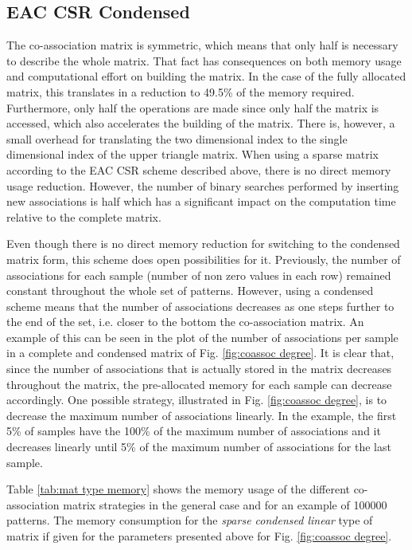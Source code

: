 \subsection{EAC CSR Condensed}

The co-association matrix is symmetric, which means that only half is necessary to describe the whole matrix.
That fact has consequences on both memory usage and computational effort on building the matrix.
In the case of the fully allocated matrix, this translates in a reduction to 49.5\% of the memory required.
Furthermore, only half the operations are made since only half the matrix is accessed, which also accelerates the building of the matrix.
There is, however, a small overhead for translating the two dimensional index to the single dimensional index of the upper triangle matrix.
When using a sparse matrix according to the EAC CSR scheme described above, there is no direct memory usage reduction.
However, the number of binary searches performed by inserting new associations is half which has a significant impact on the computation time relative to the complete matrix.

Even though there is no direct memory reduction for switching to the condensed matrix form, this scheme does open possibilities for it.
Previously, the number of associations for each sample (number of non zero values in each row) remained constant throughout the whole set of patterns.
However, using a condensed scheme means that the number of associations decreases as one steps further to the end of the set, i.e. closer to the bottom the co-association matrix.
An example of this can be seen in the plot of the number of associations per sample in a complete and condensed matrix of Fig. \ref{fig:coassoc degree}.
It is clear that, since the number of associations that is actually stored in the matrix decreases throughout the matrix, the pre-allocated memory for each sample can decrease accordingly.
One possible strategy, illustrated in Fig. \ref{fig:coassoc degree}, is to decrease the maximum number of associations linearly.
In the example, the first 5\% of samples have the 100\% of the maximum number of associations and it decreases linearly until 5\% of the maximum number of associations for the last sample.

Table \ref{tab:mat type memory} shows the memory usage of the different co-association matrix strategies in the general case and for an example of 100000 patterns.
The memory consumption for the \emph{sparse condensed linear} type of matrix if given for the parameters presented above for Fig. \ref{fig:coassoc degree}.


